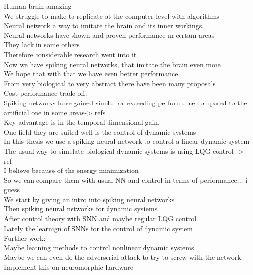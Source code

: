 

Human brain amazing\\
We struggle to make to replicate at the computer level with algorithms\\
Neural network a way to imitate the brain and its inner workings.\\
Neural networks have shown and proven performance in certain areas\\
They lack in some others\\
Therefore considerable research went into it\\
Now we have spiking neural networks, that imitate the brain even more\\
We hope that with that we have even better performance\\
From very biological to very abstract there have been many proposals\\
Cost performance trade off.\\
Spiking networks have gained similar or exceeding performance compared to the artificial one in some areas-> refs\\
Key advantage is in the temporal dimensional gain.\\
One field they are suited well is the control of dynamic systems\\
In this thesis we use a spiking neural network to control a linear dynamic system\\
The usual way to simulate biological dynamic systems is using LQG control -> ref\\
I believe because of the energy minimization\\
So we can compare them with usual NN and control in terms of performance... i guess\\
We start by giving an intro into spiking neural networks\\
Then spiking neural networks for dynamic systems\\
After control theory with SNN and maybe regular LQG control\\
Lately the learnign of SNNs for the control of dynamic system\\

Further work:\\
Maybe learning methods to control nonlinear dynamic systems\\
Maybe we can even do the adverserial attack to try to screw with the network.\\
Implement this on neuromorphic hardware\\

